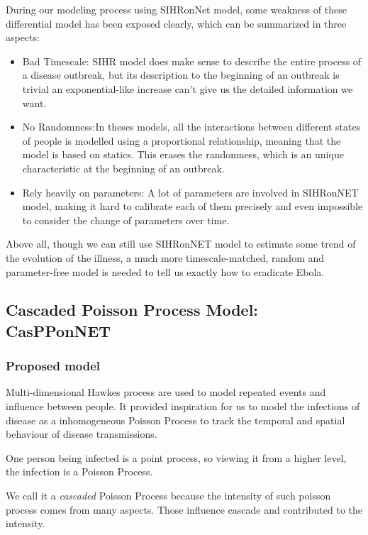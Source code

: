 \documentclass[11pt]{article}
\begin{document}
During our modeling process using SIHRonNet model, some weakness of these differential model has been exposed clearly, which can be summarized in three aspects:
\begin{itemize}

\item Bad Timescale: SIHR model does make sense to describe the entire process of a disease outbreak, but its description to the beginning of an outbreak is trivial an exponential-like increase can't give us the detailed information we want.  
\item No Randomness:In theses models, all the interactions between different states of people is modelled using a proportional relationship, meaning that the model is based on statics. This erases the randomness, which is an unique characteristic at the beginning of an outbreak.
\item Rely heavily on parameters: A lot of parameters are involved in SIHRonNET model, making it hard to calibrate each of them precisely and even impossible to consider the change of parameters over time.

\end{itemize}

Above all, though we can still use SIHRonNET model to estimate some trend of the evolution of the illness, a much more timescale-matched, random and parameter-free model is needed to tell us exactly how to eradicate Ebola.
 

\subsection{Cascaded Poisson Process Model: CasPPonNET}
\subsubsection{Proposed model}
Multi-dimensional Hawkes process\cite{zhou2013learning}\cite{iwata2013discovering} are used to model repeated events and influence between people. It provided inspiration for us to model the infections of disease as a inhomogeneous Poisson Process to track the temporal and spatial behaviour of disease transmissions.

One person being infected is a point process, so viewing it from a higher level, the infection is a Poisson Process.


We call it a \emph{cascaded} Poisson Process because the intensity of such poisson process comes from many aspects. Those influence cascade and contributed to the intensity. 
\end{document}
